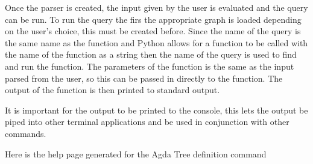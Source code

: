 Once the parser is created, the input given by the user is evaluated and the
query can be run. To run the query the firs the appropriate graph is loaded
depending on the user's choice, this must be created before. Since the name of
the query is the same name as the function and Python allows for a function to
be called with the name of the function as a string then the name of the query
is used to find and run the function. The parameters of the function is the
same as the input parsed from the user, so this can be passed in directly to
the function. The output of the function is then printed to standard output.

It is important for the output to be printed to the console, this lets the
output be piped into other terminal applications and be used in conjunction
with other commands.



Here is the help page generated for the Agda Tree definition command

